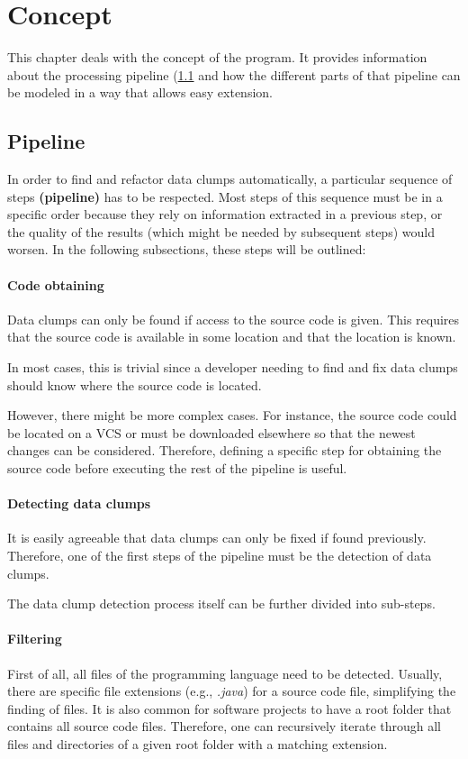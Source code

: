 \begingroup
\renewcommand{\cleardoublepage}{} %
\renewcommand{\clearpage}{}
\chapter{Concept}\label{chapter_conception}
\endgroup
This chapter deals with the concept of the program. It provides information about the processing pipeline (\ref{sec:pipeline} and how the different parts of that pipeline can be modeled in a way that allows easy extension. 


\hfill
\section{Pipeline}\label{sec:pipeline}
In order to find and refactor data clumps automatically, a particular sequence of steps \textbf{(pipeline)} has to be respected. Most steps of this sequence must be in a specific order because they rely on information extracted in a previous step, or the quality of the results (which might be needed by subsequent steps) would worsen. In the following subsections, these steps will be outlined:
\subsubsection{Code obtaining}
Data clumps can only be found if access to the source code is given. This requires that the source code is available in some location and that the location is known.

In most cases, this is trivial since a developer needing to find and fix data clumps should know where the source code is located.

However, there might be more complex cases. For instance, the source code could be located on a \ac{VCS} or must be downloaded elsewhere so that the newest changes can be considered. Therefore, defining a specific step for obtaining the source code before executing the rest of the pipeline is useful. 
\subsubsection{Detecting data clumps}\label{subsec:chap3_data_clump_detection}
It is easily agreeable that data clumps can only be fixed if found previously. Therefore, one of the first steps of the pipeline must be the detection of data clumps. 

The data clump detection process itself can be further divided into sub-steps.
\subsubsection{Filtering}\label{subsub:filtering_files}
First of all, all files of the programming language need to be detected. Usually, there are specific file extensions (e.g., \textit{.java}) for a source code file, simplifying the finding of files. It is also common for software projects to have a root folder that contains all source code files. Therefore, one can recursively iterate through all files and directories of a given root folder with a matching extension. 

